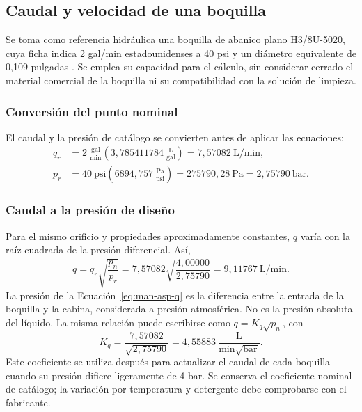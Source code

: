 \subsection{Caudal y velocidad de una boquilla}
\label{sec:man-asp-boquilla}

Se toma como referencia hidráulica una boquilla de abanico plano H3/8U-5020,
cuya ficha indica 2 gal/min estadounidenses a 40 psi y un diámetro equivalente
de 0,109 pulgadas \cite{manSpray}. Se emplea su capacidad para el cálculo,
sin considerar cerrado el material comercial de la boquilla ni su
compatibilidad con la solución de limpieza.

\subsubsection{Conversión del punto nominal}
El caudal y la presión de catálogo se convierten antes de aplicar las ecuaciones:
\begin{align}
 q_r&=2\ \frac{\mathrm{gal}}{\mathrm{min}}
 \left(3{,}785411784\ \frac{\mathrm{L}}{\mathrm{gal}}\right)
 =7{,}57082\ \mathrm{L/min},\label{eq:man-asp-qr}\\
 p_r&=40\ \mathrm{psi}\left(6894{,}757\ \frac{\mathrm{Pa}}{\mathrm{psi}}\right)
 =275790{,}28\ \mathrm{Pa}=2{,}75790\ \mathrm{bar}.
 \label{eq:man-asp-pr}
\end{align}

\subsubsection{Caudal a la presión de diseño}
Para el mismo orificio y propiedades aproximadamente constantes,
$q$ varía con la raíz cuadrada de la presión diferencial. Así,
\begin{equation}
 q=q_r\sqrt{\frac{p_n}{p_r}}
 =7{,}57082\sqrt{\frac{4{,}00000}{2{,}75790}}
 =\boxed{9{,}11767\ \mathrm{L/min}}.
 \label{eq:man-asp-q}
\end{equation}
La presión de la Ecuación~\eqref{eq:man-asp-q} es la diferencia entre la
entrada de la boquilla y la cabina, considerada a presión atmosférica.
No es la presión absoluta del líquido. La misma relación puede escribirse
como $q=K_q\sqrt{p_n}$, con
\begin{equation}
 K_q=\frac{7{,}57082}{\sqrt{2{,}75790}}
 =4{,}55883\ \frac{\mathrm{L}}{\mathrm{min}\sqrt{\mathrm{bar}}}.
 \label{eq:man-asp-kq}
\end{equation}
Este coeficiente se utiliza después para actualizar el caudal de cada
boquilla cuando su presión difiere ligeramente de 4 bar. Se conserva el
coeficiente nominal de catálogo; la variación por temperatura y detergente
debe comprobarse con el fabricante.

